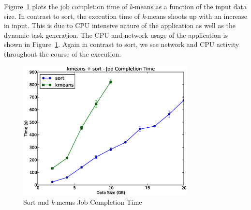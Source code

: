 \documentclass[a4paper,12pt,twoside,openright]{report}
\begin{document}
Figure~\ref{chap:eval:sec:ciel:fig:kmeans} plots the job completion time of
\emph{k}-means as a function of the input data size. In contrast to sort, the
execution time of \emph{k}-means shoots up with an increase in input. This is
due to CPU intensive nature of the application as well as the dynamic task
generation. The CPU and network usage of the application is shown in
Figure~\ref{chap:eval:sec:ciel:fig:kmeans}. Again in contrast to sort, we see
network and CPU activity throughout the course of the execution.

\begin{figure}[h!]
  \centering
    \includegraphics[width=0.8\textwidth]{kmeans_sort.eps}
    \caption{Sort and \emph{k}-means Job Completion Time}
    \label{chap:eval:sec:ciel:fig:kmeans}
\end{figure}
\end{document}
